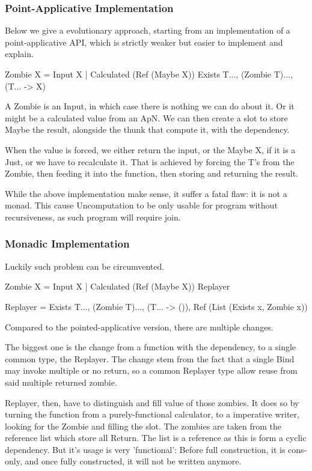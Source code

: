 \subsubsection{Point-Applicative Implementation}
Below we give a evolutionary approach, starting from an implementation of a point-applicative API, which is strictly weaker but easier to implement and explain.

Zombie X = Input X | Calculated (Ref (Maybe X)) Exists T..., (Zombie T)..., (T... -> X)

A Zombie is an Input, in which case there is nothing we can do about it.
Or it might be a calculated value from an ApN. We can then create a slot to store Maybe the result, alongside the thunk that compute it, with the dependency.

When the value is forced, we either return the input, or the Maybe X, if it is a Just, or we have to recalculate it. That is achieved by forcing the T's from the Zombie, then feeding it into the function, then storing and returning the result.

While the above implementation make sense, it suffer a fatal flaw: it is not a monad. This cause Uncomputation to be only usable for program without recursiveness, as such program will require join.
\subsubsection{Monadic Implementation}
Luckily such problem can be circumvented.

Zombie X = Input X | Calculated (Ref (Maybe X)) Replayer

Replayer = Exists T..., (Zombie T)..., (T... -> ()), Ref (List (Exists x, Zombie x))

Compared to the pointed-applicative version, there are multiple changes.

The biggest one is the change from a function with the dependency, to a single common type, the Replayer. The change stem from the fact that a single Bind may invoke multiple or no return, so a common Replayer type allow reuse from said multiple returned zombie.

Replayer, then, have to distinguish and fill value of those zombies. It does so by turning the function from a purely-functional calculator, to a imperative writer, looking for the Zombie and filling the slot. The zombies are taken from the reference list which store all Return. The list is a reference as this is form a cyclic dependency. But it's usage is very 'functional': Before full construction, it is cons-only, and once fully constructed, it will not be written anymore.

